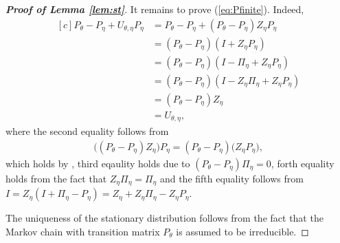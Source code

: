 \documentclass[11pt]{article}
\theoremstyle{definition}
\numberwithin{equation}{section}
\begin{document}
\begin{proof}[\textbf{Proof of Lemma \ref{lem:st}}]
 It remains to prove (\ref{eq:Pfinite}).   Indeed,
      \begin{equation*}
\begin{aligned}[c]
   P_{\theta}- P_{\eta} + U_{\theta, \eta}  P_{\eta}& = P_{\theta}- P_{\eta} +  (P_{\theta} - P_{\eta}) Z_{\eta}   P_{\eta}\\
   & =  (P_{\theta}- P_{\eta} )(I + Z_{\eta}   P_{\eta} )\\
   & = (P_{\theta}- P_{\eta} )(I -\Pi_{\eta} + Z_{\eta}   P_{\eta} )   \\
   & =   (P_{\theta}- P_{\eta} )(I - Z_{\eta}  \Pi_{\eta} + Z_{\eta}   P_{\eta} )    \\
   & =  (P_{\theta}- P_{\eta} ) Z_{\eta} \\
   & = U_{\theta, \eta},
\end{aligned}
\end{equation*}
where the second equality follows from
  \begin{align*}
    \Big((P_{\theta} - P_{\eta}) Z_{\eta} \Big)  P_{\eta} =     (P_{\theta} - P_{\eta}) \Big(Z_{\eta}  P_{\eta} \Big),
  \end{align*}
  which holds   by \cite[Corollary 1.9]{Kemeny1976}, third eqaulity holds due to $(P_{\theta}- P_{\eta}) \Pi_{\eta}=0$, forth equality holds from the fact that $ Z_{\eta}  \Pi_{\eta} = \Pi_{\eta}$  and the fifth equality follows from $ I = Z_{\eta}(I + \Pi_\eta - P_\eta) = Z_\eta + Z_\eta \Pi_\eta - Z_\eta P_{\eta}$.


The uniqueness of the stationary distribution follows from the fact that the Markov chain with transition matrix $P_{\theta}$ is assumed to be irreducible.


\end{proof}
\end{document}
